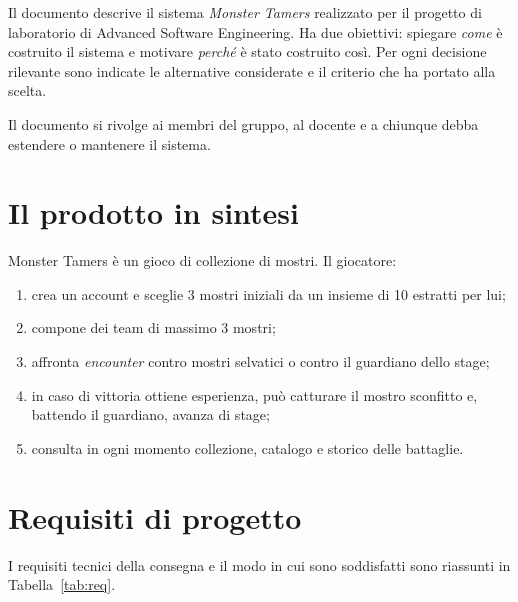 \documentclass[11pt,a4paper]{report}
\begin{document}
Il documento descrive il sistema \emph{Monster Tamers} realizzato per il progetto di laboratorio di Advanced Software Engineering. Ha due obiettivi: spiegare \emph{come} è costruito il sistema e motivare \emph{perché} è stato costruito così. Per ogni decisione rilevante sono indicate le alternative considerate e il criterio che ha portato alla scelta.

Il documento si rivolge ai membri del gruppo, al docente e a chiunque debba estendere o mantenere il sistema.

\section{Il prodotto in sintesi}

Monster Tamers è un gioco di collezione di mostri. Il giocatore:
\begin{enumerate}
  \item crea un account e sceglie 3 mostri iniziali da un insieme di 10 estratti per lui;
  \item compone dei team di massimo 3 mostri;
  \item affronta \emph{encounter} contro mostri selvatici o contro il guardiano dello stage;
  \item in caso di vittoria ottiene esperienza, può catturare il mostro sconfitto e, battendo il guardiano, avanza di stage;
  \item consulta in ogni momento collezione, catalogo e storico delle battaglie.
\end{enumerate}

\section{Requisiti di progetto}

I requisiti tecnici della consegna e il modo in cui sono soddisfatti sono riassunti in Tabella~\ref{tab:req}.
\end{document}
